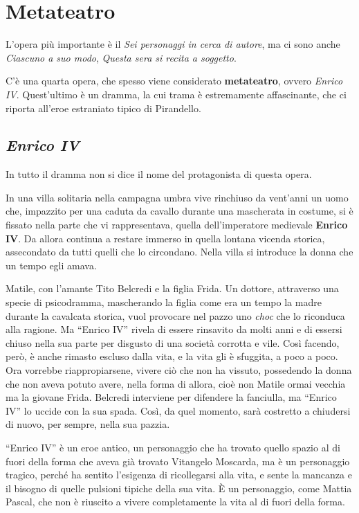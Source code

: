 \documentclass[a4paper, twoside, titlepage]{book}
\begin{document}
\section{Metateatro}

L’opera più importante è il \textit{Sei personaggi in cerca di autore}, ma ci sono anche \textit{Ciascuno a suo modo}, \textit{Questa sera si recita a soggetto}.

C’è una quarta opera, che spesso viene considerato \textbf{metateatro}, ovvero \textit{Enrico IV}.
Quest’ultimo è un dramma, la cui trama è estremamente affascinante, che ci riporta all’eroe estraniato tipico di Pirandello.

\subsection{\textit{Enrico IV}}

In tutto il dramma non si dice il nome del protagonista di questa opera.

In una villa solitaria nella campagna umbra vive rinchiuso da vent'anni un uomo che, impazzito per una caduta da cavallo durante una mascherata in costume, si è fissato nella parte che vi rappresentava, quella dell'imperatore medievale \textbf{Enrico IV}. Da allora continua a restare immerso in quella lontana vicenda storica, assecondato da tutti quelli che lo circondano. Nella villa si introduce la donna che un tempo egli amava.

Matile, con l'amante Tito Belcredi e la figlia Frida. Un dottore, attraverso una specie di psicodramma, mascherando la figlia come era un tempo la madre durante la cavalcata storica, vuol provocare nel pazzo uno \textit{choc} che lo riconduca alla ragione. Ma ``Enrico IV'' rivela di essere rinsavito da molti anni e di essersi chiuso nella sua parte per disgusto di una società corrotta e vile. Così facendo, però, è anche rimasto escluso dalla vita, e la vita gli è sfuggita, a poco a poco. Ora vorrebbe riappropiarsene, vivere ciò che non ha vissuto, possedendo la donna che non aveva potuto avere, nella forma di allora, cioè non Matile ormai vecchia ma la giovane Frida. Belcredi interviene per difendere la fanciulla, ma ``Enrico IV'' lo uccide con la sua spada. Così, da quel momento, sarà costretto a chiudersi di nuovo, per sempre, nella sua pazzia.

“Enrico IV” è un eroe antico, un personaggio che ha trovato quello spazio al di fuori della forma che aveva già trovato Vitangelo Moscarda, ma è un personaggio tragico, perché ha sentito l’esigenza di ricollegarsi alla vita, e sente la mancanza e il bisogno di quelle pulsioni tipiche della sua vita.
È un personaggio, come Mattia Pascal, che non è riuscito a vivere completamente la vita al di fuori della forma.
\end{document}
